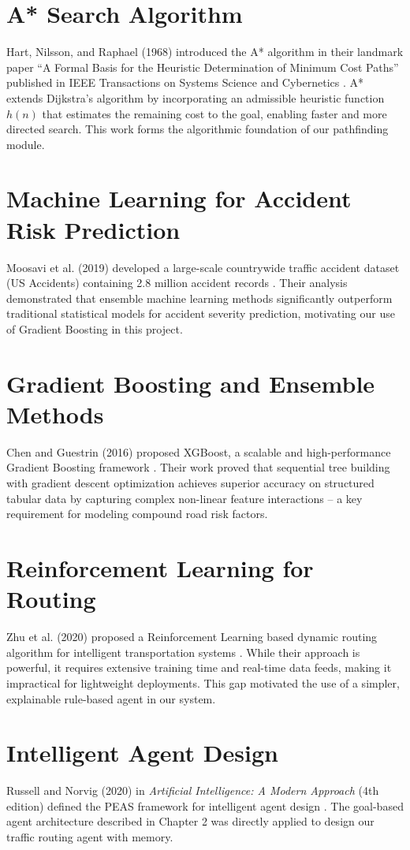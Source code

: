\documentclass[12pt,a4paper]{report}
\begin{document}
\section{A* Search Algorithm}
Hart, Nilsson, and Raphael (1968) introduced the A* algorithm in their landmark paper ``A Formal Basis for the Heuristic Determination of Minimum Cost Paths'' published in IEEE Transactions on Systems Science and Cybernetics \cite{hart1968}. A* extends Dijkstra's algorithm by incorporating an admissible heuristic function $h(n)$ that estimates the remaining cost to the goal, enabling faster and more directed search. This work forms the algorithmic foundation of our pathfinding module.

\section{Machine Learning for Accident Risk Prediction}
Moosavi et al. (2019) developed a large-scale countrywide traffic accident dataset (US Accidents) containing 2.8 million accident records \cite{moosavi2019}. Their analysis demonstrated that ensemble machine learning methods significantly outperform traditional statistical models for accident severity prediction, motivating our use of Gradient Boosting in this project.

\section{Gradient Boosting and Ensemble Methods}
Chen and Guestrin (2016) proposed XGBoost, a scalable and high-performance Gradient Boosting framework \cite{chen2016}. Their work proved that sequential tree building with gradient descent optimization achieves superior accuracy on structured tabular data by capturing complex non-linear feature interactions -- a key requirement for modeling compound road risk factors.

\section{Reinforcement Learning for Routing}
Zhu et al. (2020) proposed a Reinforcement Learning based dynamic routing algorithm for intelligent transportation systems \cite{zhu2020}. While their approach is powerful, it requires extensive training time and real-time data feeds, making it impractical for lightweight deployments. This gap motivated the use of a simpler, explainable rule-based agent in our system.

\section{Intelligent Agent Design}
Russell and Norvig (2020) in \textit{Artificial Intelligence: A Modern Approach} (4th edition) defined the PEAS framework for intelligent agent design \cite{russell2020}. The goal-based agent architecture described in Chapter 2 was directly applied to design our traffic routing agent with memory.
\end{document}
